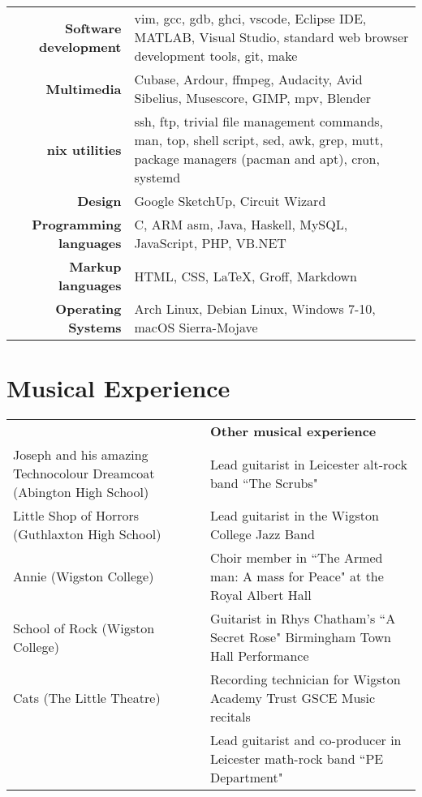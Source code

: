 \documentclass{article}
\begin{document}
{\renewcommand{\arraystretch}{2}

\begin{tabular}{ r | p{10cm} }

{\large\bfseries Software development} & {vim, gcc, gdb, ghci, vscode, Eclipse IDE, MATLAB, Visual Studio, standard web browser development tools, git, make}\\
{\large\bfseries Multimedia} & {Cubase, Ardour, ffmpeg, Audacity, Avid Sibelius, Musescore, GIMP, mpv, Blender} \\
{\large\bfseries *nix utilities} & {ssh, ftp, trivial file management commands, man, top, shell script, sed, awk, grep, mutt, package managers (pacman and apt), cron, systemd} \\
{\large\bfseries Design} & {Google SketchUp, Circuit Wizard} \\
{\large\bfseries Programming languages} & {C, ARM asm, Java, Haskell, MySQL, JavaScript, PHP, VB.NET}\\
{\large\bfseries Markup languages} & {HTML, CSS, \LaTeX, Groff, Markdown}\\
{\large\bfseries Operating Systems} & {Arch Linux, Debian Linux, Windows 7-10, macOS Sierra-Mojave}\\


\end{tabular}

\section{Musical Experience}

{\renewcommand{\arraystretch}{1.4}

\begin{tabular}{>{\centering}p{} | >{\centering}p{} }
{\large\bfseries Shows as a pit-band guitarist} & {\large\bfseries Other musical experience}
\tabularnewline
Joseph and his amazing Technocolour Dreamcoat (Abington High School) & Lead guitarist in Leicester alt-rock band ``The Scrubs"
\tabularnewline
Little Shop of Horrors (Guthlaxton High School) & Lead guitarist in the Wigston College Jazz Band
\tabularnewline
Annie (Wigston College) & Choir member in ``The Armed man: A mass for Peace" at the Royal Albert Hall
\tabularnewline
School of Rock (Wigston College) & Guitarist in Rhys Chatham's ``A Secret Rose" Birmingham Town Hall Performance
\tabularnewline
Cats (The Little Theatre) & Recording technician for Wigston Academy Trust GSCE Music recitals
\tabularnewline
{} & Lead guitarist and co-producer in Leicester math-rock band ``PE Department"


\end{tabular}}}
\end{document}
